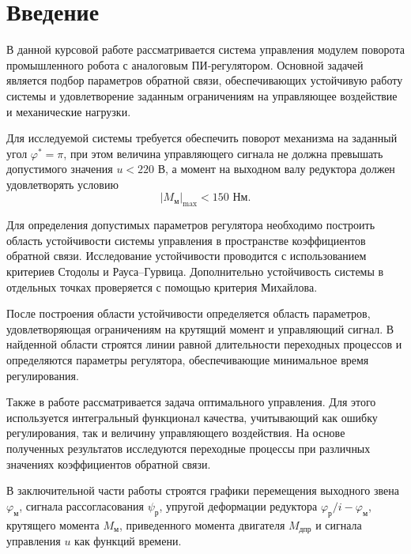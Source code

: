 \section*{Введение}

В данной курсовой работе рассматривается система управления модулем поворота промышленного робота с аналоговым ПИ-регулятором. Основной задачей является подбор параметров обратной связи, обеспечивающих устойчивую работу системы и удовлетворение заданным ограничениям на управляющее воздействие и механические нагрузки.

Для исследуемой системы требуется обеспечить поворот механизма на заданный угол $\varphi^* = \pi$, при этом величина управляющего сигнала не должна превышать допустимого значения $u < 220$ В, а момент на выходном валу редуктора должен удовлетворять условию
\[
|M_{\text{м}}|_{\max} < 150 \text{ Нм}.
\]

Для определения допустимых параметров регулятора необходимо построить область устойчивости системы управления в пространстве коэффициентов обратной связи. Исследование устойчивости проводится с использованием критериев Стодолы и Рауса--Гурвица. Дополнительно устойчивость системы в отдельных точках проверяется с помощью критерия Михайлова.

После построения области устойчивости определяется область параметров, удовлетворяющая ограничениям на крутящий момент и управляющий сигнал. В найденной области строятся линии равной длительности переходных процессов и определяются параметры регулятора, обеспечивающие минимальное время регулирования.

Также в работе рассматривается задача оптимального управления. Для этого используется интегральный функционал качества, учитывающий как ошибку регулирования, так и величину управляющего воздействия. На основе полученных результатов исследуются переходные процессы при различных значениях коэффициентов обратной связи.

В заключительной части работы строятся графики перемещения выходного звена $\varphi_{\text{м}}$, сигнала рассогласования $\psi_{\text{р}}$, упругой деформации редуктора $\varphi_{\text{р}}/i - \varphi_{\text{м}}$, крутящего момента $M_{\text{м}}$, приведенного момента двигателя $M_{\text{дпр}}$ и сигнала управления $u$ как функций времени.
